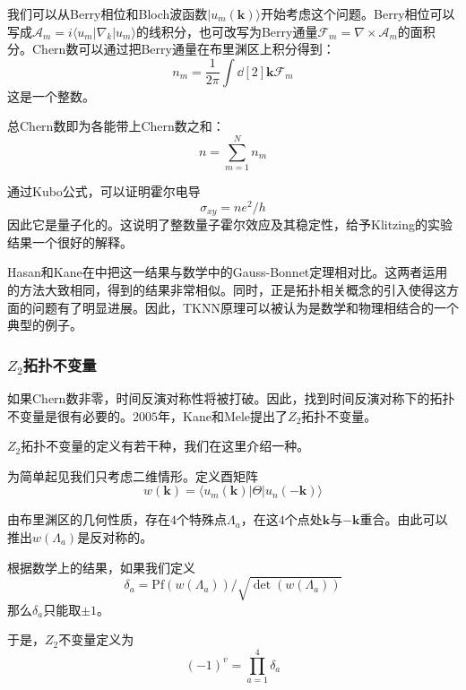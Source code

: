 我们可以从Berry相位\cite{Berry1984}和Bloch波函数$|u_m(\mathbf k)\rangle$开始考虑这个问题。Berry相位可以写成$\mathcal{A}_m=i\langle u_m|\nabla_k|u_m\rangle$的线积分，也可改写为Berry通量$\mathcal{F}_m=\nabla\times\mathcal{A}_m$的面积分。Chern数可以通过把Berry通量在布里渊区上积分得到：
\begin{equation}
    n_m=\frac{1}{2\pi}\int \dd[2]{\mathbf{k}\mathcal{F}_m}
\end{equation}
这是一个整数。

总Chern数即为各能带上Chern数之和：
\begin{equation}
    n=\sum_{m=1}^N n_m
\end{equation}

通过Kubo公式，可以证明霍尔电导
\begin{equation}
    \sigma_{xy}=ne^2/h
\end{equation}
因此它是量子化的。这说明了整数量子霍尔效应及其稳定性，给予Klitzing的实验结果一个很好的解释。

Hasan和Kane在\cite{Hasan2010}中把这一结果与数学中的Gauss-Bonnet定理相对比。这两者运用的方法大致相同，得到的结果非常相似。同时，正是拓扑相关概念的引入使得这方面的问题有了明显进展。因此，TKNN原理可以被认为是数学和物理相结合的一个典型的例子。

\subsubsection{$Z_2$拓扑不变量}

如果Chern数非零，时间反演对称性将被打破。因此，找到时间反演对称下的拓扑不变量是很有必要的。$2005$年，Kane和Mele提出了$Z_2$拓扑不变量\cite{Kane2005Z}。

$Z_2$拓扑不变量的定义有若干种，我们在这里介绍一种\cite{Fu2006}。

为简单起见我们只考虑二维情形。定义酉矩阵
\begin{equation}
    w(\mathbf{k})=\langle u_m(\mathbf{k})|\Theta|u_n(-\mathbf{k})\rangle
\end{equation}

由布里渊区的几何性质，存在$4$个特殊点$\Lambda_a$，在这$4$个点处$\mathbf{k}$与$-\mathbf{k}$重合。由此可以推出$w(\Lambda_a)$是反对称的。

根据数学上的结果，如果我们定义
\begin{equation}
    \delta_a=\mathrm{Pf}(w(\Lambda_a))/\sqrt{\det(w(\Lambda_a))}
\end{equation}
那么$\delta_a$只能取$\pm1$。

于是，$Z_2$不变量定义为
\begin{equation}
    (-1)^v=\prod_{a=1}^{4}\delta_a
\end{equation}

